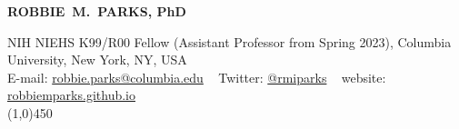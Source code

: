 \begin{center}

\textbf{{\LARGE ROBBIE~M.~PARKS, PhD}\\}

\small NIH NIEHS K99/R00 Fellow (Assistant Professor from Spring 2023), Columbia University, New York, NY, USA\\

E-mail: \href{mailto:robbie.parks@columbia.edu}{robbie.parks@columbia.edu} ~ Twitter: \href{https://twitter.com/rmiparks}{@rmiparks} ~ website: \href{https://robbiemparks.github.io}{robbiemparks.github.io}\\

\line(1,0){450}

\end{center}